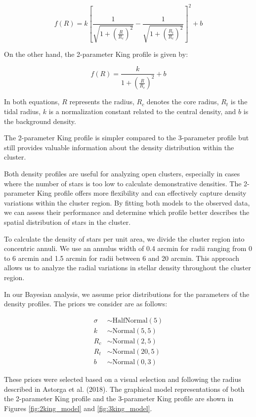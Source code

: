 \documentclass[fleqn,usenatbib,usedcolumn,useAMS]{mnras}
\begin{document}
\begin{equation*}
f(R) = k \left[\frac{1}{\sqrt{1 + \left(\frac{R}{R_c}\right)^2}} - \frac{1}{\sqrt{1 + \left(\frac{R_t}{R_c}\right)^2}}\right]^2 + b
\end{equation*}

On the other hand, the 2-parameter King profile is given by:

\begin{equation*}
f(R) = \frac{k}{1 + \left(\frac{R}{R_c}\right)^2} + b
\end{equation*}

In both equations, $R$ represents the radius, $R_c$ denotes the core radius, $R_t$ is the tidal radius, $k$ is a normalization constant related to the central density, and $b$ is the background density.

The 2-parameter King profile is simpler compared to the 3-parameter profile but still provides valuable information about the density distribution within the cluster.

Both density profiles are useful for analyzing open clusters, especially in cases where the number of stars is too low to calculate demonstrative densities. The 2-parameter King profile offers more flexibility and can effectively capture density variations within the cluster region. By fitting both models to the observed data, we can assess their performance and determine which profile better describes the spatial distribution of stars in the cluster.

To calculate the density of stars per unit area, we divide the cluster region into concentric annuli. We use an annulus width of 0.4 arcmin for radii ranging from 0 to 6 arcmin and 1.5 arcmin for radii between 6 and 20 arcmin. This approach allows us to analyze the radial variations in stellar density throughout the cluster region.

In our Bayesian analysis, we assume prior distributions for the parameters of the density profiles. The priors we consider are as follows:

\begin{align*}
\sigma & \sim \text{HalfNormal}(5) \\
k & \sim \text{Normal}(5, 5) \\
R_c & \sim \text{Normal}(2, 5) \\
R_t & \sim \text{Normal}(20, 5) \\
b & \sim \text{Normal}(0, 3)
\end{align*}

These priors were selected based on a visual selection and following the radius described in Astorga et al. (2018). The graphical model representations of both the 2-parameter King profile and the 3-parameter King profile are shown in Figures \ref{fig:2king_model} and \ref{fig:3king_model}.
\end{document}
